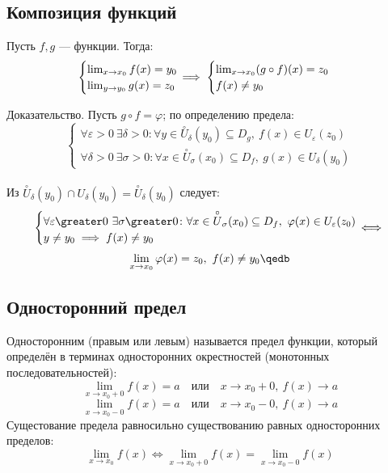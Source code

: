 \subsection{Композиция функций}

\begin{theorem}
Пусть $f,g$ --- функции. Тогда:
$$\begin{cases}
\lim_{x\to x_0}f(x)=y_0\\
\lim_{y\to y_0}g(x)=z_0
\end{cases}\hspace*{-12pt}\implies\begin{cases}
\lim_{x\to x_0}(g\circ f)(x)=z_0\\
f(x)\neq y_0
\end{cases}$$
\end{theorem}
{\bold Доказательство.} Пусть $g\circ f=\varphi$; по определению предела:\\[-14pt]
$$\begin{cases}
\forall\varepsilon\greater 0\ \exists\delta\greater 0\colon\forall y\in\overset{\circ}{U}_\delta(y_0)\subseteq D_g,\ f(x)\in U_\varepsilon(z_0)\\
\forall\delta\greater 0\ \exists\sigma\greater 0\colon\forall x\in\overset{\circ}{U}_\sigma(x_0)\subseteq D_f,\ g(x)\in U_\delta(y_0)
\end{cases}$$\\[-6pt]
Из $\overset{\circ}{U}_\delta(y_0)\cap U_\delta(y_0)=\overset{\circ}{U}_\delta(y_0)$ 
следует:\\[-14pt]
$$\begin{cases}
\forall\varepsilon\greater 0\ \exists\sigma\greater 0\colon\forall x\in\overset{\circ}{U}_\sigma(x_0)\subseteq D_f,\ \varphi(x)\in U_\varepsilon(z_0)\\
y\neq y_0\implies f(x)\neq y_0
\end{cases}\hspace*{-12pt}\iff$$
$$\lim_{x\to x_0}\varphi(x)=z_0,\ f(x)\neq y_0\qedb$$

\subsection{Односторонний предел}

{\bold Односторонним} {\ital\color{desc}(правым или левым)} называется предел функции, который определён в терминах односторонних окрестностей {\ital (монотонных последовательностей)}:
$$\lim_{x\to x_0+0}f(x)=a\quad\text{или}\quad x\to x_0+0,\ f(x)\to a$$
$$\lim_{x\to x_0-0}f(x)=a\quad\text{или}\quad x\to x_0-0,\ f(x)\to a$$
Сущестование предела равносильно существованию {\ital равных} односторонних пределов:
$$\lim_{x\to x_0}f(x)\iff\lim_{x\to x_0+0}f(x)=\lim_{x\to x_0-0}f(x)$$

